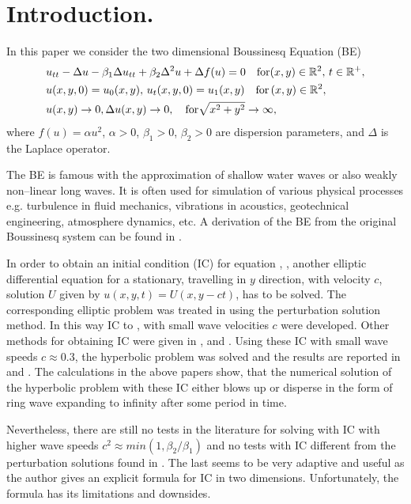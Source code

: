 \documentclass[11pt,a4paper,twoside]{article}
\begin{document}

\section{Introduction.}\label{introduction}
In this paper we  consider the two dimensional Boussinesq  Equation (BE)
\begin{align} \label{eq1}
&u_{tt} - \Delta u -\beta_1  \Delta u_{tt} +\beta_2 \Delta ^2 u + \Delta f(u)=0   \quad \text{for}  (x,y) \in \mathbb{R}^2, \, t\in\mathbb{R}^+, 
\\ \nonumber &u(x,y,0)=u_0(x,y), \, u_t(x,y,0)=u_1(x,y)   \quad\text{for} \, (x,y) \in \mathbb{R}^2,
\\  &u(x,y) \rightarrow 0,  \Delta u(x,y) \rightarrow 0 ,  \quad \text{for}  \sqrt{x^2 + y^2} \rightarrow \infty, \label{eq11}
\end{align}
where $f(u)=\alpha u^2$,  $\alpha>0$, $\beta_1>0$, $\beta_2>0$  are dispersion parameters, and $\Delta$ is the Laplace operator. 

The BE is famous with the approximation of shallow water waves or also weakly non--linear long waves. It is often used for simulation of various physical processes e.g. turbulence in fluid mechanics, vibrations in acoustics, geotechnical engineering, atmosphere dynamics, etc. A derivation of the BE from the original Boussinesq system can be found in \cite{ChChr}.

In order to obtain an initial condition (IC) for equation , , another elliptic differential equation for a stationary, travelling in $y$  direction, with velocity $c$, solution $U$ given by $u(x,y,t)=U(x,y-ct)$, has to be solved. The corresponding elliptic problem was treated in \cite{Ch2011} using the perturbation solution method. In this way IC to ,   with small wave velocities $c$ were developed. Other methods for obtaining IC were given in \cite{chr-chr},\cite{chr-chr-07} and \cite{EllipticProblem}.
Using these  IC with small wave speeds $c \approx 0.3$, the hyperbolic problem  was solved and the results are  reported in \cite{cher} and \cite{dani}. The calculations in the above papers show, that the numerical solution of the hyperbolic problem with these IC either blows up or disperse in the form of ring wave expanding to infinity after some period in time.

 Nevertheless, there are still no tests in the literature for solving  with IC with higher wave speeds $c^2 \approx min(1, \beta_2/{\beta_1})$ and no tests with IC different from the perturbation solutions found in \cite{Ch2011}. The last seems to be very adaptive and useful as the author gives an explicit formula for IC in two dimensions. Unfortunately, the formula has its limitations and downsides. 
\end{document}
